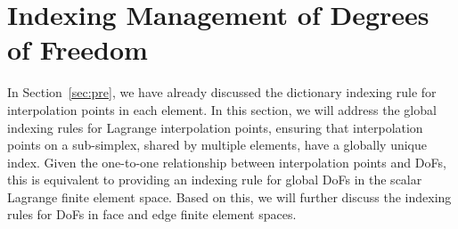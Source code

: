 \documentclass[mathpazo]{cicp}
\begin{document}




\section{Indexing Management of Degrees of Freedom}\label{sec:implementation}

In Section~\ref{sec:pre}, we have already discussed
the dictionary indexing rule for interpolation points in each element. In this
section, we will address the global indexing rules for Lagrange
interpolation points, ensuring that interpolation points on a sub-simplex,
shared by multiple elements, have a globally unique index.  Given the
one-to-one relationship between interpolation points and DoFs, this is
equivalent to providing an indexing rule for global DoFs in the scalar Lagrange
finite element space. Based on this, we will further discuss the indexing
rules for DoFs in face and edge finite element spaces.
\end{document}
